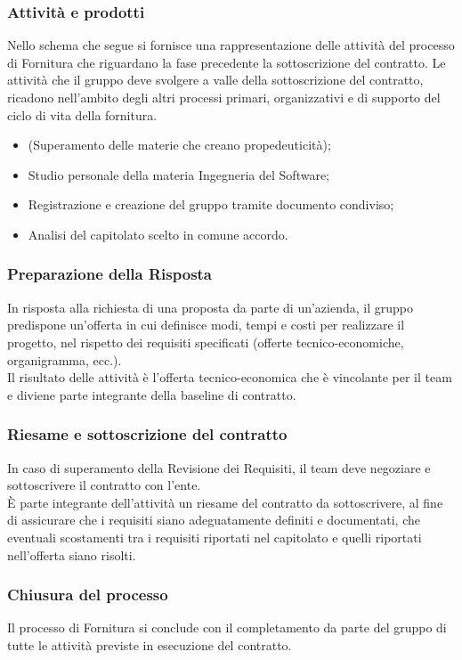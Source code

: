 \documentclass[12pt,a4paper,titlepage]{article}
\begin{document}
\subsubsection{Attività e prodotti}
Nello schema che segue si fornisce una rappresentazione delle attività del processo di Fornitura che riguardano la fase precedente la sottoscrizione del contratto. Le attività che il gruppo deve svolgere a valle della sottoscrizione del contratto, ricadono nell'ambito degli altri processi primari, organizzativi e di supporto del ciclo di vita della fornitura.
\begin{itemize}
	\item (Superamento delle materie che creano propedeuticità);
	\item Studio personale della materia Ingegneria del Software;
	\item Registrazione e creazione del gruppo tramite documento condiviso;
	\item Analisi del capitolato scelto in comune accordo.
\end{itemize}

\subsubsection{Preparazione della Risposta}
In risposta alla richiesta di una proposta da parte di un'azienda, il gruppo predispone un'offerta in cui definisce modi, tempi e costi per realizzare il progetto, nel rispetto dei requisiti specificati (offerte tecnico-economiche, organigramma, ecc.).\\
Il risultato delle attività è l'offerta tecnico-economica che è vincolante per il team e diviene parte integrante della baseline di contratto.

\subsubsection{Riesame e sottoscrizione del contratto}
In caso di superamento della Revisione dei Requisiti, il team deve negoziare e sottoscrivere il contratto con l'ente.\\
È parte integrante dell'attività un riesame del contratto da sottoscrivere, al fine di assicurare che i requisiti siano adeguatamente definiti e documentati, che eventuali scostamenti tra i requisiti riportati nel capitolato e quelli riportati nell'offerta siano risolti.

\subsubsection{Chiusura del processo}
Il processo di Fornitura si conclude con il completamento da parte del gruppo di tutte le attività previste in esecuzione del contratto.
\end{document}
